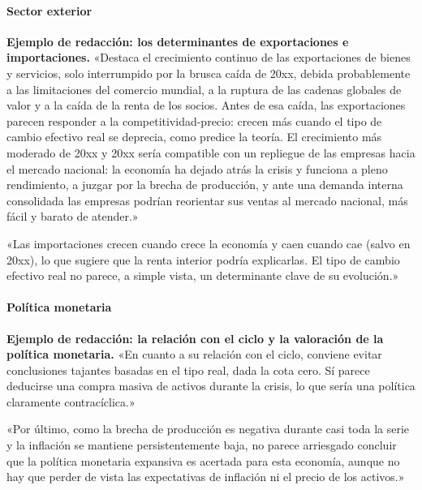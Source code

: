 \documentclass[11pt]{article}
\begin{document}
\paragraph{Sector exterior}
\begin{anotaciones}
\textbf{Ejemplo de redacción: los determinantes de exportaciones e importaciones.}
«Destaca el crecimiento continuo de las exportaciones de bienes y servicios, solo interrumpido por la brusca caída de 20xx, debida probablemente a las limitaciones del comercio mundial, a la ruptura de las cadenas globales de valor y a la caída de la renta de los socios. Antes de esa caída, las exportaciones parecen responder a la competitividad-precio: crecen más cuando el tipo de cambio efectivo real se deprecia, como predice la teoría. El crecimiento más moderado de 20xx y 20xx sería compatible con un repliegue de las empresas hacia el mercado nacional: la economía ha dejado atrás la crisis y funciona a pleno rendimiento, a juzgar por la brecha de producción, y ante una demanda interna consolidada las empresas podrían reorientar sus ventas al mercado nacional, más fácil y barato de atender.»

«Las importaciones crecen cuando crece la economía y caen cuando cae (salvo en 20xx), lo que sugiere que la renta interior podría explicarlas. El tipo de cambio efectivo real no parece, a simple vista, un determinante clave de su evolución.»
\end{anotaciones}

\paragraph{Política monetaria}
\begin{anotaciones}
\textbf{Ejemplo de redacción: la relación con el ciclo y la valoración de la política monetaria.}
«En cuanto a su relación con el ciclo, conviene evitar conclusiones tajantes basadas en el tipo real, dada la cota cero. Sí parece deducirse una compra masiva de activos durante la crisis, lo que sería una política claramente contracíclica.»

«Por último, como la brecha de producción es negativa durante casi toda la serie y la inflación se mantiene persistentemente baja, no parece arriesgado concluir que la política monetaria expansiva es acertada para esta economía, aunque no hay que perder de vista las expectativas de inflación ni el precio de los activos.»
\end{anotaciones}
\end{document}
